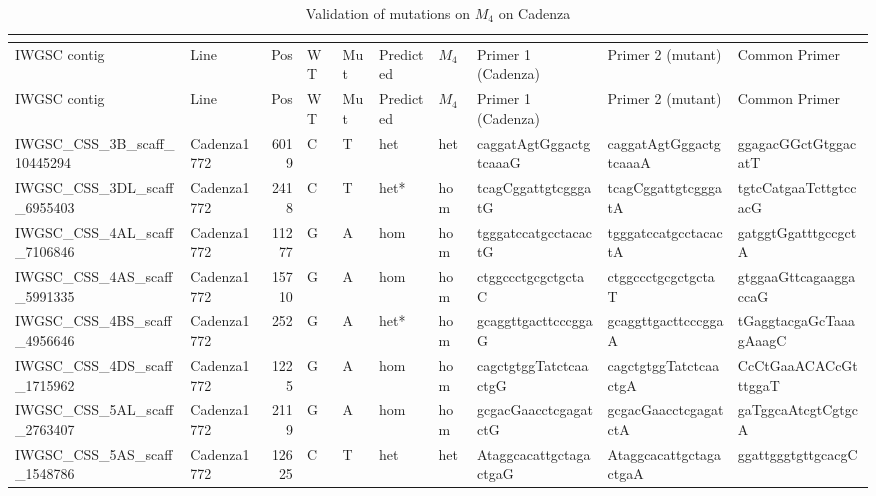 \begin{longtable}{llrlllllll}
\caption{Validation of mutations on $M_{4}$ on Cadenza}\\
\label{app:PolyMarkerM4ValidationCadenza}\\
\toprule
 IWGSC contig                 & Line       &   Pos & WT   & Mut   & Predicted   & $M_{4}$      & Primer 1 (Cadenza)        & Primer 2 (mutant)         & Common Primer             \\
\midrule
\endfirsthead
\toprule
 IWGSC contig                 & Line       &   Pos & WT   & Mut   & Predicted   & $M_{4}$      & Primer 1 (Cadenza)        & Primer 2 (mutant)         & Common Primer             \\
\midrule
\endhead
\bottomrule
\endfoot
\bottomrule
\endlastfoot
 IWGSC\_CSS\_3B\_scaff\_10445294  & Cadenza1772 &       6019 & C         & T        & het            & het         & caggatAgtGggactgtcaaaG    & caggatAgtGggactgtcaaaA    & ggagacGGctGtggacatT       \\
 IWGSC\_CSS\_3DL\_scaff\_6955403  & Cadenza1772 &       2418 & C         & T        & het*           & hom         & tcagCggattgtcgggatG       & tcagCggattgtcgggatA       & tgtcCatgaaTcttgtccacG     \\
 IWGSC\_CSS\_4AL\_scaff\_7106846  & Cadenza1772 &      11277 & G         & A        & hom            & hom         & tgggatccatgcctacactG      & tgggatccatgcctacactA      & gatggtGgatttgccgctA       \\
 IWGSC\_CSS\_4AS\_scaff\_5991335  & Cadenza1772 &      15710 & G         & A        & hom            & hom         & ctggccctgcgctgctaC        & ctggccctgcgctgctaT        & gtggaaGttcagaaggaccaG     \\
 IWGSC\_CSS\_4BS\_scaff\_4956646  & Cadenza1772 &        252 & G         & A        & het*           & hom         & gcaggttgacttcccggaG       & gcaggttgacttcccggaA       & tGaggtacgaGcTaaagAaagC    \\
 IWGSC\_CSS\_4DS\_scaff\_1715962  & Cadenza1772 &       1225 & G         & A        & hom            & hom         & cagctgtggTatctcaactgG     & cagctgtggTatctcaactgA     & CcCtGaaACACcGtttggaT      \\
 IWGSC\_CSS\_5AL\_scaff\_2763407  & Cadenza1772 &       2119 & G         & A        & hom            & hom         & gcgacGaacctcgagatctG      & gcgacGaacctcgagatctA      & gaTggcaAtcgtCgtgcA        \\
 IWGSC\_CSS\_5AS\_scaff\_1548786  & Cadenza1772 &      12625 & C         & T        & het            & het         & AtaggcacattgctagactgaG    & AtaggcacattgctagactgaA    & ggattgggtgttgcacgC        \\

\end{longtable}
